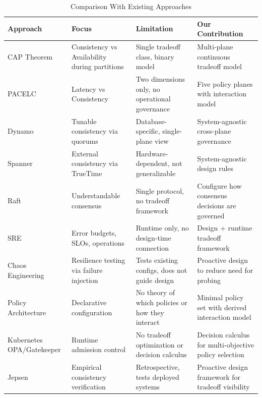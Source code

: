 \documentclass[conference]{IEEEtran}
\begin{document}
\begin{table}[t]
\caption{Comparison With Existing Approaches}
\label{tab:novelty}
\centering
\small
\renewcommand{\arraystretch}{1.15}


\begin{tabularx}{\columnwidth}{@{}p{1.8cm}X X X@{}}
\toprule
\textbf{Approach} &
\textbf{Focus} &
\textbf{Limitation} &
\textbf{Our Contribution} \\
\midrule

CAP Theorem~\cite{brewer2000cap}
& Consistency vs Availability during partitions
& Single tradeoff class, binary model
& Multi-plane continuous tradeoff model \\

PACELC~\cite{pacelc}
& Latency vs Consistency
& Two dimensions only, no operational governance
& Five policy planes with interaction model \\

Dynamo~\cite{dynamo}
& Tunable consistency via quorums
& Database-specific, single-plane view
& System-agnostic cross-plane governance \\

Spanner~\cite{spanner}
& External consistency via TrueTime
& Hardware-dependent, not generalizable
& System-agnostic design rules \\

Raft~\cite{raft}
& Understandable consensus
& Single protocol, no tradeoff framework
& Configure how consensus decisions are governed \\

SRE~\cite{sre}
& Error budgets, SLOs, operations
& Runtime only, no design-time connection
& Design + runtime tradeoff framework \\

Chaos Engineering~\cite{chaos}
& Resilience testing via failure injection
& Tests existing configs, does not guide design
& Proactive design to reduce need for probing \\

Policy Architecture~\cite{policyarch}
& Declarative configuration
& No theory of which policies or how they interact
& Minimal policy set with derived interaction model \\

Kubernetes OPA/Gatekeeper
& Runtime admission control
& No tradeoff optimization or decision calculus
& Decision calculus for multi-objective policy selection \\

Jepsen~\cite{jepsen}
& Empirical consistency verification
& Retrospective, tests deployed systems
& Proactive design framework for tradeoff visibility \\

\bottomrule
\end{tabularx}

\end{table}
\end{document}
